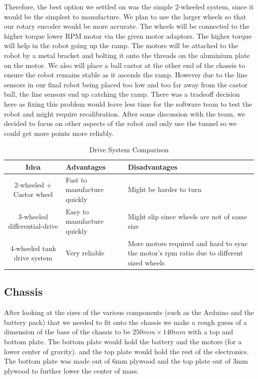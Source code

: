 \documentclass{article}
\begin{document}
\quad Therefore, the best option we settled on was the simple 2-wheeled system, since it would be the simplest to manufacture. We plan to use the larger wheels so that our rotary encoder would be more accurate. The wheels will be connected to the higher torque lower RPM motor via the given motor adaptors. The higher torque will help in the robot going up the ramp. The motors will be attached to the robot by a metal bracket and bolting it onto the threads on the aluminium plate on the motor. We also will place a ball castor at the other end of the chassis to ensure the robot remains stable as it ascends the ramp. However due to the line sensors in our final robot being placed too low and too far away from the castor ball, the line sensors end up catching the ramp. There was a tradeoff decision here as fixing this problem would leave less time for the software team to test the robot and might require recalibration. After some discussion with the team, we decided to focus on other aspects of the robot and only use the tunnel so we could get more points more reliably.

\begin{table}[]
    \centering
    \begin{tabular}{|c|p{5cm}|p{5cm}|}
        \hline
        Idea & Advantages & Disadvantages \\
        \hline
        2-wheeled + Castor wheel & Fast to manufacture quickly& Might be harder to turn \\
        3-wheeled differential-drive & Easy to manufacture quickly & Might slip since wheels are not of same size \\
        4-wheeled tank drive system & Very reliable & More motors required and hard to sync the motor's rpm ratio due to different sized wheels \\
        \hline
    \end{tabular}
    \caption{Drive System Comparison}
    \label{tab:drive_comp}
\end{table}

\subsection{Chassis}
\quad After looking at the sizes of the various components (such as the Arduino and the battery pack) that we needed to fit onto the chassis we make a rough guess of a dimension of the base of the chassis to be $250mm \times 140mm$ with a top and bottom plate. The bottom plate would hold the battery and the motors (for a lower center of gravity). and the top plate would hold the rest of the electronics. The bottom plate was made out of 6mm plywood and the top plate out of 3mm plywood to further lower the center of mass.
\end{document}

